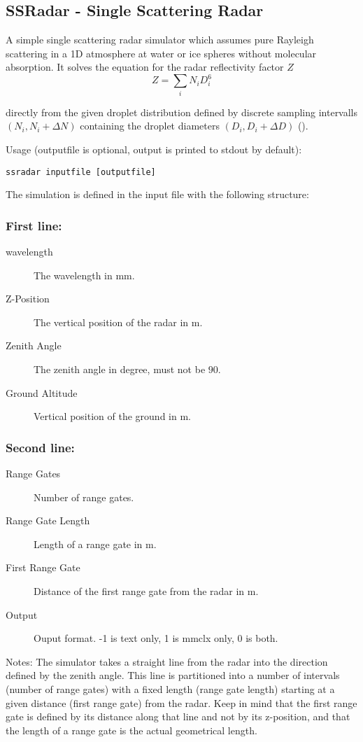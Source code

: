\subsection{SSRadar - Single Scattering Radar }

A simple single scattering radar simulator which assumes pure Rayleigh scattering
in a 1D atmosphere at water or ice spheres without molecular absorption. It solves 
the equation for the radar reflectivity factor $Z$
$$
Z = \sum_i N_i D_i^6
$$

directly from the given droplet distribution defined by discrete sampling intervalls
$\left(N_i, N_i + \Delta N\right)$ containing the droplet diameters $\left(D_i, D_i 
+ \Delta D\right)$ (\citet{Rinehart2010}).

Usage (outputfile is optional, output is printed to stdout by default):
\begin{Verbatim}[fontsize=\footnotesize]
ssradar inputfile [outputfile]
\end{Verbatim}
The simulation is defined in the input file with the following structure:
\subsubsection {First line:}
\begin{description}
\item[wavelength] The wavelength in mm.
\item[Z-Position] The vertical position of the radar in m.
\item[Zenith Angle] The zenith angle in degree, must not be $90$.
\item[Ground Altitude] Vertical position of the ground in m.
\end{description}
\subsubsection{Second line:}
\begin{description}
\item[Range Gates] Number of range gates.
\item[Range Gate Length] Length of a range gate in m.
\item[First Range Gate] Distance of the first range gate from the radar in m.
\item[Output] Ouput format. -1 is text only, 1 is mmclx only, 0 is both.
\end{description}
Notes: The simulator takes a straight line from the radar into the direction defined
by the zenith angle. This line is partitioned into a number of intervals (number of 
range gates) with a fixed length (range gate length) starting at a given distance 
(first range gate) from the radar. Keep in mind that the first range gate is defined by 
its distance along that line and not by its z-position, and that the length of a range
gate is the actual geometrical length.
